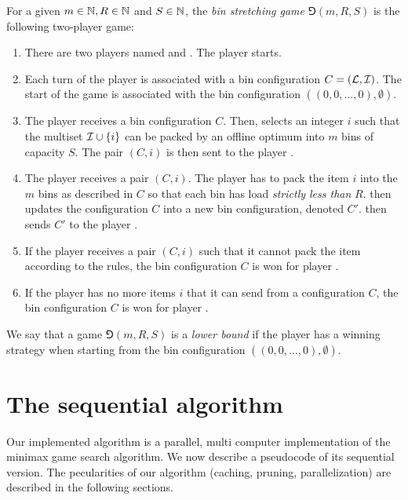 \begin{dfn}
For a given $m \in \mathbb{N}, R \in \mathbb{N}$ and $S \in \mathbb{N}$, the \emph{bin stretching game} $\Game(m,R,S)$ is the following two-player game:

\begin{enumerate}
\item There are two players named \adversary and \algo. The player \adversary starts.
\item Each turn of the player \adversary is associated with a bin configuration $C = ({\mathcal L},{\mathcal I})$.
The start of the game is associated with the bin configuration $((0,0,\ldots,0),\emptyset)$.
\item The player \adversary receives a bin configuration $C$. Then,
\adversary selects an integer $i$ such that the multiset ${\mathcal I} \cup
\{i\}$ can be packed by an offline optimum into $m$ bins of
capacity $S$. The pair $(C,i)$ is then sent to the player \algo.
\item The player \algo receives a pair $(C,i)$. The player \algo has
to pack the item $i$ into the $m$ bins as described in $C$ so that
each bin has load \emph{strictly less than} $R$. \algo then updates the
configuration $C$ into a new bin configuration, denoted $C'$. \algo
then sends $C'$ to the player \adversary.
\item If the player \algo receives a pair $(C,i)$ such that it cannot pack
the item according to the rules, the bin configuration $C$ is won for player \adversary.
\item If the player \adversary has no more items $i$ that it can send from a
configuration $C$, the bin configuration $C$ is won for player \algo.
\end{enumerate}
\end{dfn}

\begin{dfn}
We say that a game $\Game(m,R,S)$ is a \emph{lower bound} if the player
\adversary has a winning strategy when starting from the bin configuration
$((0,0,\ldots,0),\emptyset)$.
\end{dfn}

\section{The sequential algorithm}\label{sec:minimax}

Our implemented algorithm is a parallel, multi computer implementation
of the minimax game search algorithm. We now describe a pseudocode of
its sequential version. The pecularities of our algorithm (caching,
pruning, parallelization) are described in the following sections.

